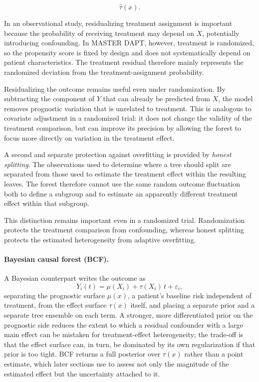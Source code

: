 \[
\hat\tau(x).
\]

In an observational study, residualizing treatment assignment is important because the
probability of receiving treatment may depend on $X$, potentially introducing confounding.
In MASTER DAPT, however, treatment is randomized, so the propensity score is fixed by
design and does not systematically depend on patient characteristics. The treatment residual
therefore mainly represents the randomized deviation from the treatment-assignment
probability.

Residualizing the outcome remains useful even under randomization. By subtracting the
component of $Y$ that can already be predicted from $X$, the model removes prognostic
variation that is unrelated to treatment. This is analogous to covariate adjustment in a
randomized trial: it does not change the validity of the treatment comparison, but can
improve its precision by allowing the forest to focus more directly on variation in the
treatment effect.

A second and separate protection against overfitting is provided by \emph{honest splitting}.
The observations used to determine where a tree should split are separated from those used
to estimate the treatment effect within the resulting leaves. The forest therefore cannot
use the same random outcome fluctuation both to define a subgroup and to estimate an
apparently different treatment effect within that subgroup.

This distinction remains important even in a randomized trial. Randomization protects the
treatment comparison from confounding, whereas honest splitting protects the estimated
heterogeneity from adaptive overfitting.

\paragraph{Bayesian causal forest (BCF).}
A Bayesian counterpart \citep{hahn2020bcf} writes the outcome as
\[
Y_i(t) = \mu(X_i) + \tau(X_i)\, t + \varepsilon_i,
\]
separating the prognostic surface $\mu(x)$, a patient's baseline risk
independent of treatment, from the effect surface $\tau(x)$ itself, and
placing a separate prior and a separate tree ensemble on each term. A
stronger, more differentiated prior on the prognostic side reduces the
extent to which a residual confounder with a large main effect can be
mistaken for treatment-effect heterogeneity; the trade-off is that the
effect surface can, in turn, be dominated by its own regularization if
that prior is too tight. BCF returns a full posterior over $\tau(x)$
rather than a point estimate, which later sections use to assess not
only the magnitude of the estimated effect but the uncertainty attached
to it.

